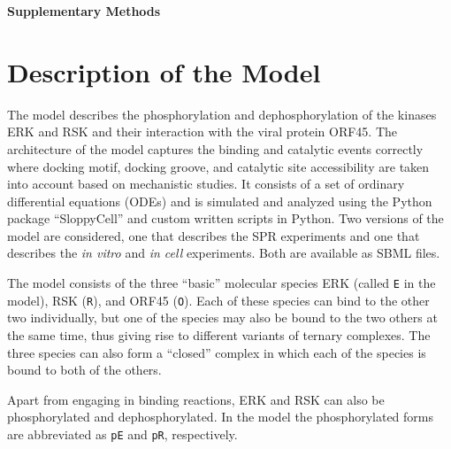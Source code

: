 \documentclass[12pt]{article}
\begin{document}
	
	{\noindent\Large \textbf{Supplementary Methods}}
	
	\section{Description of the Model}
	The model describes the phosphorylation and dephosphorylation of the kinases ERK and RSK and their interaction with the viral protein ORF45. The architecture of the model captures the binding and catalytic events correctly where docking motif, docking groove, and catalytic site accessibility are taken into account based on mechanistic studies. It consists of a set of ordinary differential equations (ODEs) and is simulated and analyzed using the Python package ``SloppyCell'' and custom written scripts in Python. Two versions of the model are considered, one that describes the SPR experiments and one that describes the \textit{in vitro} and \textit{in cell} experiments. Both are available as SBML files.
	
	The model consists of the three ``basic'' molecular species ERK
	(called \texttt{E} in the model), RSK (\texttt{R}), and ORF45 (\texttt{O}).
	Each of these species can bind to the other two individually, but
	one of the species may also be bound to the two others at the same
	time, thus giving rise to different variants of ternary complexes.
	The three species can also form a ``closed'' complex in
	which each of the species is bound to both of the others.
	
	Apart from engaging in binding reactions, ERK and RSK can also be
	phosphorylated and dephosphorylated. In the model the phosphorylated
	forms are abbreviated as \texttt{pE} and \texttt{pR}, respectively.
	
\end{document}
